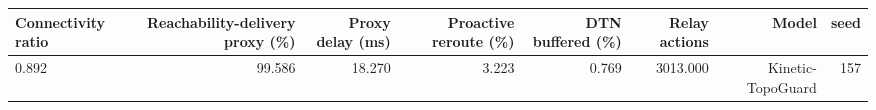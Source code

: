 \begin{tabular}{lrrrrrrr}
\toprule
Connectivity ratio & Reachability-delivery proxy (\%) & Proxy delay (ms) & Proactive reroute (\%) & DTN buffered (\%) & Relay actions & Model & seed \\
\midrule
0.892 & 99.586 & 18.270 & 3.223 & 0.769 & 3013.000 & Kinetic-TopoGuard & 157 \\
\bottomrule
\end{tabular}